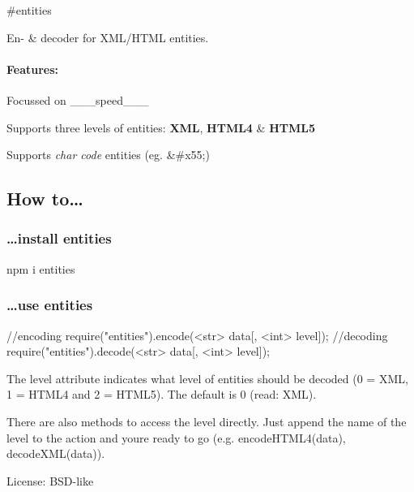\#entities \href{https://npmjs.org/package/entities}{\tt } \href{https://npmjs.org/package/entities}{\tt } \href{http://travis-ci.org/fb55/node-entities}{\tt } \href{https://coveralls.io/r/fb55/node-entities}{\tt }

En-\/ \& decoder for X\+M\+L/\+H\+T\+ML entities.

\paragraph*{Features\+:}


\begin{DoxyItemize}
\item Focussed on \+\_\+\+\_\+\+\_\+speed\+\_\+\+\_\+\+\_\+
\item Supports three levels of entities\+: {\bfseries X\+ML}, {\bfseries H\+T\+M\+L4} \& {\bfseries H\+T\+M\+L5}
\begin{DoxyItemize}
\item Supports {\itshape char code} entities (eg. {\ttfamily \&\#x55;})
\end{DoxyItemize}
\end{DoxyItemize}

\subsection*{How to…}

\subsubsection*{…install {\ttfamily entities}}

\begin{DoxyVerb}npm i entities
\end{DoxyVerb}


\subsubsection*{…use {\ttfamily entities}}


\begin{DoxyCode}
//encoding
require("entities").encode(<str> data[, <int> level]);
//decoding
require("entities").decode(<str> data[, <int> level]);
\end{DoxyCode}


The {\ttfamily level} attribute indicates what level of entities should be decoded (0 = X\+ML, 1 = H\+T\+M\+L4 and 2 = H\+T\+M\+L5). The default is 0 (read\+: X\+ML).

There are also methods to access the level directly. Just append the name of the level to the action and you\textquotesingle{}re ready to go (e.\+g. {\ttfamily encode\+H\+T\+M\+L4(data)}, {\ttfamily decode\+X\+M\+L(data)}). 



License\+: B\+S\+D-\/like 